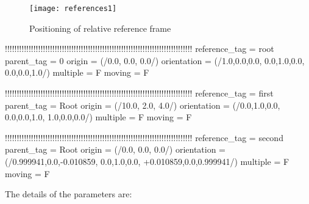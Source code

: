 \begin{figure}
\centering
\texttt{[image: references1]}
\caption{Positioning of relative reference frame}
\label{fig:references1}
\end{figure}

\begin{inputfile}[frame=single, caption={references\_static.in}, 
    label={file:references_static.in}]
!!!!!!!!!!!!!!!!!!!!!!!!!!!!!!!!!!!!!!!!!!!!!!!!!!!!!!!!!!!!!!!!!!!!!!!!!!!!!!!
reference_tag = root
parent_tag = 0
origin = (/0.0, 0.0, 0.0/)
orientation = (/1.0,0.0,0.0, 0.0,1.0,0.0, 0.0,0.0,1.0/)
multiple = F
moving = F

!!!!!!!!!!!!!!!!!!!!!!!!!!!!!!!!!!!!!!!!!!!!!!!!!!!!!!!!!!!!!!!!!!!!!!!!!!!!!!!
reference_tag = first
parent_tag = Root
origin = (/10.0, 2.0, 4.0/)
orientation = (/0.0,1.0,0.0, 0.0,0.0,1.0, 1.0,0.0,0.0/)
multiple = F
moving = F

!!!!!!!!!!!!!!!!!!!!!!!!!!!!!!!!!!!!!!!!!!!!!!!!!!!!!!!!!!!!!!!!!!!!!!!!!!!!!!!
reference_tag = second
parent_tag = Root
origin = (/0.0, 0.0, 0.0/)
orientation = (/0.999941,0.0,-0.010859, 0.0,1.0,0.0, +0.010859,0.0,0.999941/)
multiple = F
moving = F
\end{inputfile}
The details of the parameters are:
